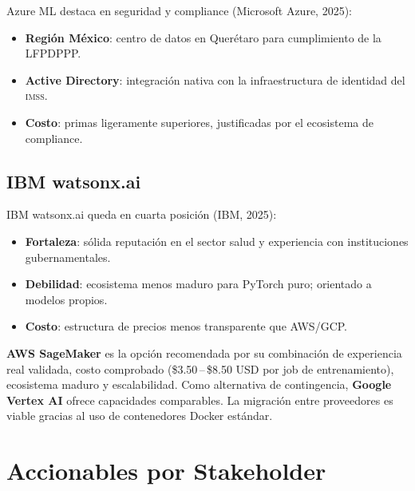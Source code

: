 \documentclass[12pt, letterpaper]{article}
\newcommand{\imss}{\textnormal{\textsc{imss}}}
\begin{document}
Azure ML destaca en seguridad y compliance (Microsoft Azure, 2025):

\begin{itemize}[noitemsep]
    \item \textbf{Región México}: centro de datos en Querétaro para cumplimiento de la LFPDPPP.
    \item \textbf{Active Directory}: integración nativa con la infraestructura de identidad del {\imss}.
    \item \textbf{Costo}: primas ligeramente superiores, justificadas por el ecosistema de compliance.
\end{itemize}

\subsection{IBM watsonx.ai}

IBM watsonx.ai queda en cuarta posición (IBM, 2025):

\begin{itemize}[noitemsep]
    \item \textbf{Fortaleza}: sólida reputación en el sector salud y experiencia con instituciones gubernamentales.
    \item \textbf{Debilidad}: ecosistema menos maduro para PyTorch puro; orientado a modelos propios.
    \item \textbf{Costo}: estructura de precios menos transparente que AWS/GCP.
\end{itemize}

\begin{insightbox}
\textbf{AWS SageMaker} es la opción recomendada por su combinación de experiencia real validada, costo comprobado (\$3.50\,--\,\$8.50 USD por job de entrenamiento), ecosistema maduro y escalabilidad. Como alternativa de contingencia, \textbf{Google Vertex AI} ofrece capacidades comparables. La migración entre proveedores es viable gracias al uso de contenedores Docker estándar.
\end{insightbox}

\newpage
\section{Accionables por Stakeholder}\label{sec:accionables}
\end{document}
